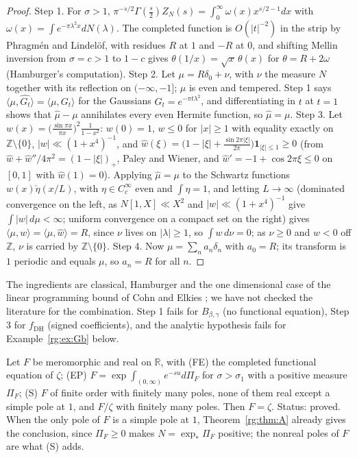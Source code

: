 \begin{proof}
Step 1. For $\sigma>1$, $\pi^{-s/2}\Gamma(\frac s2)Z_N(s)=\int_0^\infty\omega(x)x^{s/2-1}dx$ with $\omega(x)=\int e^{-\pi\lambda^2x}dN(\lambda)$. The completed function is $O(|t|^{-2})$ in the strip by Phragm\'en and Lindel\"of, with residues $R$ at $1$ and $-R$ at $0$, and shifting Mellin inversion from $\sigma=c>1$ to $1-c$ gives $\theta(1/x)=\sqrt x\,\theta(x)$ for $\theta=R+2\omega$ (Hamburger's computation). Step 2. Let $\mu=R\delta_0+\nu$, with $\nu$ the measure $N$ together with its reflection on $(-\infty,-1]$; $\mu$ is even and tempered. Step 1 says $\langle\mu,\widehat{G_t}\rangle=\langle\mu,G_t\rangle$ for the Gaussians $G_t=e^{-\pi t\lambda^2}$, and differentiating in $t$ at $t=1$ shows that $\widehat\mu-\mu$ annihilates every even Hermite function, so $\widehat\mu=\mu$. Step 3. Let $w(x)=\big(\frac{\sin\pi x}{\pi x}\big)^2\frac1{1-x^2}$: $w(0)=1$, $w\le0$ for $|x|\ge1$ with equality exactly on $\mathbb Z\setminus\{0\}$, $|w|\ll(1+x^4)^{-1}$, and $\widehat w(\xi)=\big(1-|\xi|+\frac{\sin2\pi|\xi|}{2\pi}\big)\mathbf 1_{|\xi|\le1}\ge0$ (from $\widehat w+\widehat w''/4\pi^2=(1-|\xi|)_+$, Paley and Wiener, and $\widehat w'=-1+\cos2\pi\xi\le0$ on $[0,1]$ with $\widehat w(1)=0$). Applying $\widehat\mu=\mu$ to the Schwartz functions $w(x)\check\eta(x/L)$, with $\eta\in C_c^\infty$ even and $\int\eta=1$, and letting $L\to\infty$ (dominated convergence on the left, as $N[1,X]\ll X^2$ and $|w|\ll(1+x^4)^{-1}$ give $\int|w|\,d\mu<\infty$; uniform convergence on a compact set on the right) gives $\langle\mu,w\rangle=\langle\mu,\widehat w\rangle=R$, since $\nu$ lives on $|\lambda|\ge1$, so $\int w\,d\nu=0$; as $\nu\ge0$ and $w<0$ off $\mathbb Z$, $\nu$ is carried by $\mathbb Z\setminus\{0\}$. Step 4. Now $\mu=\sum_na_n\delta_n$ with $a_0=R$; its transform is $1$ periodic and equals $\mu$, so $a_n=R$ for all $n$. \qedhere
\end{proof}

The ingredients are classical, Hamburger \cite{NCHamburger21} and the one dimensional case of the linear programming bound of Cohn and Elkies \cite{NCCohnElkies03}; we have not checked the literature for the combination. Step 1 fails for $B_{\beta,\gamma}$ (no functional equation), Step 3 for $f_{\mathrm{DH}}$ (signed coefficients), and the analytic hypothesis fails for Example~\ref{rg:ex:Gb} below.

\begin{theorem}\label{rg:thm:surgery}
Let $F$ be meromorphic and real on $\mathbb R$, with (FE) the completed functional equation of $\zeta$; (EP) $F=\exp\int_{(0,\infty)}e^{-su}d\Pi_F$ for $\sigma>\sigma_1$ with a positive measure $\Pi_F$; (S) $F$ of finite order with finitely many poles, none of them real except a simple pole at $1$, and $F/\zeta$ with finitely many poles. Then $F=\zeta$. Status: proved. When the only pole of $F$ is a simple pole at $1$, Theorem~\ref{rg:thm:A} already gives the conclusion, since $\Pi_F\ge0$ makes $N=\exp_*\Pi_F$ positive; the nonreal poles of $F$ are what (S) adds.
\end{theorem}

